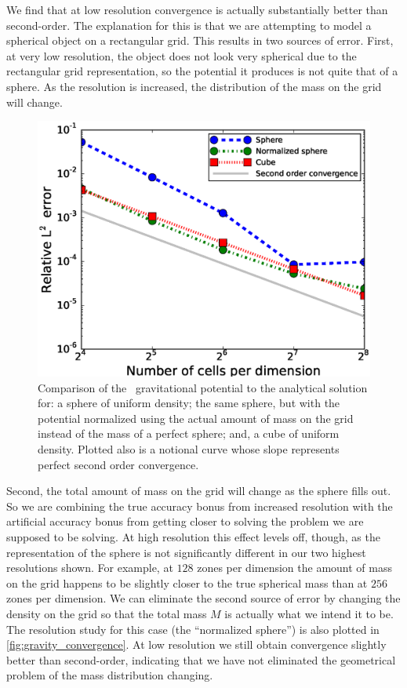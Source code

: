\documentclass[12pt]{article}
\begin{document}
We find that at low resolution convergence is actually substantially better 
than second-order. The explanation for this is that we are attempting to 
model a spherical object on a rectangular grid. This results in two sources of error.
First, at very low resolution, the object does not look very spherical due to the rectangular 
grid representation, so the potential it produces is not quite that of a sphere. 
As the resolution is increased, the distribution of the mass on the grid will change.
\begin{figure}[h!]
  \centering
  \includegraphics[scale=0.85,trim=0.075in 0.0in 0.7in 0.0in,clip]{plots/phi_comparison}
  \caption[Analytical versus numerical solution of the potential]
          {Comparison of the \castro\ gravitational potential to the analytical solution for: 
           a sphere of uniform density; the same sphere, but with the potential normalized using the 
           actual amount of mass on the grid instead of the mass of a perfect sphere; and, a 
           cube of uniform density. Plotted also is a notional curve whose slope represents
           perfect second order convergence.\label{fig:gravity_convergence}}
\end{figure}
Second, the total amount of mass on the grid will change as the sphere fills out. 
So we are combining the true accuracy bonus from increased resolution 
with the artificial accuracy bonus from getting closer to solving the problem 
we are supposed to be solving. At high resolution this effect levels off, though, 
as the representation of the sphere is not significantly different in 
our two highest resolutions shown. For example, at $128$ zones per dimension 
the amount of mass on the grid happens to be slightly closer to the true spherical 
mass than at $256$ zones per dimension.
We can eliminate the second source of error by changing the density on  
the grid so that the total mass $M$ is actually what we intend it to be.
The resolution study for this case (the ``normalized sphere'') is also
plotted in \autoref{fig:gravity_convergence}. At low resolution we still obtain
convergence slightly better than second-order, indicating that we 
have not eliminated the geometrical problem of the mass distribution changing.
\end{document}
